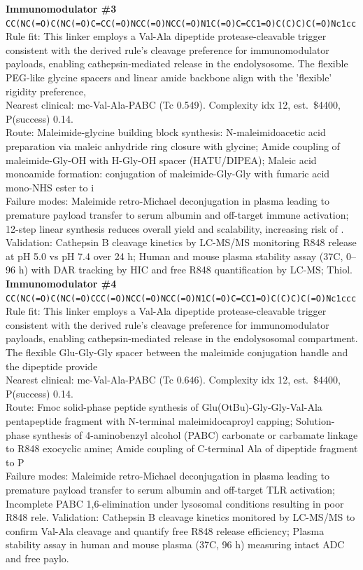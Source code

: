 \documentclass[10pt]{article}
\begin{document}
\noindent\textbf{Immunomodulator \#3} \\ \texttt{CC(NC(=O)C(NC(=O)C=CC(=O)NCC(=O)NCC(=O)N1C(=O)C=CC1=O)C(C)C)C(=O)Nc1cc} \\ Rule fit: This linker employs a Val-Ala dipeptide protease-cleavable trigger consistent with the derived rule's cleavage preference for immunomodulator payloads, enabling cathepsin-mediated release in the endolysosome. The flexible PEG-like glycine spacers and linear amide backbone align with the 'flexible' rigidity preference,  \\ Nearest clinical: mc-Val-Ala-PABC (Tc 0.549). Complexity idx 12, est.\ \$4400, P(success) 0.14. \\ Route: Maleimide-glycine building block synthesis: N-maleimidoacetic acid preparation via maleic anhydride ring closure with glycine; Amide coupling of maleimide-Gly-OH with H-Gly-OH spacer (HATU/DIPEA); Maleic acid monoamide formation: conjugation of maleimide-Gly-Gly with fumaric acid mono-NHS ester to i \\ Failure modes: Maleimide retro-Michael deconjugation in plasma leading to premature payload transfer to serum albumin and off-target immune activation; 12-step linear synthesis reduces overall yield and scalability, increasing risk of . Validation: Cathepsin B cleavage kinetics by LC-MS/MS monitoring R848 release at pH 5.0 vs pH 7.4 over 24 h; Human and mouse plasma stability assay (37\textdegree{}C, 0--96 h) with DAR tracking by HIC and free R848 quantification by LC-MS; Thiol. \\[0.4em]
\noindent\textbf{Immunomodulator \#4} \\ \texttt{CC(NC(=O)C(NC(=O)CCC(=O)NCC(=O)NCC(=O)N1C(=O)C=CC1=O)C(C)C)C(=O)Nc1ccc} \\ Rule fit: This linker employs a Val-Ala dipeptide protease-cleavable trigger consistent with the derived rule's cleavage preference for immunomodulator payloads, enabling cathepsin-mediated release in the endolysosomal compartment. The flexible Glu-Gly-Gly spacer between the maleimide conjugation handle and the dipeptide provide \\ Nearest clinical: mc-Val-Ala-PABC (Tc 0.646). Complexity idx 12, est.\ \$4400, P(success) 0.14. \\ Route: Fmoc solid-phase peptide synthesis of Glu(OtBu)-Gly-Gly-Val-Ala pentapeptide fragment with N-terminal maleimidocaproyl capping; Solution-phase synthesis of 4-aminobenzyl alcohol (PABC) carbonate or carbamate linkage to R848 exocyclic amine; Amide coupling of C-terminal Ala of dipeptide fragment to P \\ Failure modes: Maleimide retro-Michael deconjugation in plasma leading to premature payload transfer to serum albumin and off-target TLR activation; Incomplete PABC 1,6-elimination under lysosomal conditions resulting in poor R848 rele. Validation: Cathepsin B cleavage kinetics monitored by LC-MS/MS to confirm Val-Ala cleavage and quantify free R848 release efficiency; Plasma stability assay in human and mouse plasma (37\textdegree{}C, 96 h) measuring intact ADC and free paylo. \\[0.4em]
\end{document}
